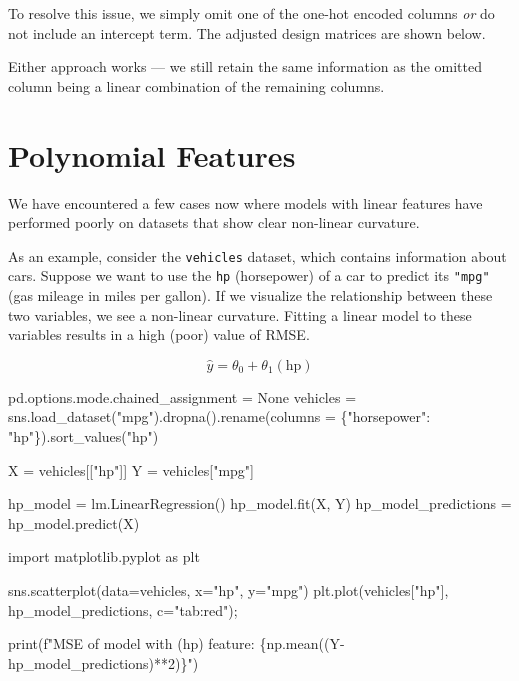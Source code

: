 \documentclass[
  letterpaper,
  DIV=11,
  numbers=noendperiod]{scrreprt}
\newenvironment{Shaded}{\begin{snugshade}}{\end{snugshade}}
\newcommand{\BuiltInTok}[1]{\textcolor[rgb]{0.00,0.23,0.31}{#1}}
\newcommand{\DecValTok}[1]{\textcolor[rgb]{0.68,0.00,0.00}{#1}}
\newcommand{\ImportTok}[1]{\textcolor[rgb]{0.00,0.46,0.62}{#1}}
\newcommand{\NormalTok}[1]{\textcolor[rgb]{0.00,0.23,0.31}{#1}}
\newcommand{\OperatorTok}[1]{\textcolor[rgb]{0.37,0.37,0.37}{#1}}
\newcommand{\SpecialCharTok}[1]{\textcolor[rgb]{0.37,0.37,0.37}{#1}}
\newcommand{\SpecialStringTok}[1]{\textcolor[rgb]{0.13,0.47,0.30}{#1}}
\newcommand{\StringTok}[1]{\textcolor[rgb]{0.13,0.47,0.30}{#1}}
\newcommand{\VariableTok}[1]{\textcolor[rgb]{0.07,0.07,0.07}{#1}}
\begin{document}
To resolve this issue, we simply omit one of the one-hot encoded columns
\emph{or} do not include an intercept term. The adjusted design matrices
are shown below.

Either approach works --- we still retain the same information as the
omitted column being a linear combination of the remaining columns.

\section{Polynomial Features}\label{polynomial-features}

We have encountered a few cases now where models with linear features
have performed poorly on datasets that show clear non-linear curvature.

As an example, consider the \texttt{vehicles} dataset, which contains
information about cars. Suppose we want to use the \texttt{hp}
(horsepower) of a car to predict its \texttt{"mpg"} (gas mileage in
miles per gallon). If we visualize the relationship between these two
variables, we see a non-linear curvature. Fitting a linear model to
these variables results in a high (poor) value of RMSE.

\[\hat{y} = \theta_0 + \theta_1 (\text{hp})\]

\begin{Shaded}
\begin{Highlighting}[]
\NormalTok{pd.options.mode.chained\_assignment }\OperatorTok{=} \VariableTok{None} 
\NormalTok{vehicles }\OperatorTok{=}\NormalTok{ sns.load\_dataset(}\StringTok{"mpg"}\NormalTok{).dropna().rename(columns }\OperatorTok{=}\NormalTok{ \{}\StringTok{"horsepower"}\NormalTok{: }\StringTok{"hp"}\NormalTok{\}).sort\_values(}\StringTok{"hp"}\NormalTok{)}

\NormalTok{X }\OperatorTok{=}\NormalTok{ vehicles[[}\StringTok{"hp"}\NormalTok{]]}
\NormalTok{Y }\OperatorTok{=}\NormalTok{ vehicles[}\StringTok{"mpg"}\NormalTok{]}

\NormalTok{hp\_model }\OperatorTok{=}\NormalTok{ lm.LinearRegression()}
\NormalTok{hp\_model.fit(X, Y)}
\NormalTok{hp\_model\_predictions }\OperatorTok{=}\NormalTok{ hp\_model.predict(X)}

\ImportTok{import}\NormalTok{ matplotlib.pyplot }\ImportTok{as}\NormalTok{ plt}

\NormalTok{sns.scatterplot(data}\OperatorTok{=}\NormalTok{vehicles, x}\OperatorTok{=}\StringTok{"hp"}\NormalTok{, y}\OperatorTok{=}\StringTok{"mpg"}\NormalTok{)}
\NormalTok{plt.plot(vehicles[}\StringTok{"hp"}\NormalTok{], hp\_model\_predictions, c}\OperatorTok{=}\StringTok{"tab:red"}\NormalTok{)}\OperatorTok{;}

\BuiltInTok{print}\NormalTok{(}\SpecialStringTok{f"MSE of model with (hp) feature: }\SpecialCharTok{\{}\NormalTok{np}\SpecialCharTok{.}\NormalTok{mean((Y}\OperatorTok{{-}}\NormalTok{hp\_model\_predictions)}\OperatorTok{**}\DecValTok{2}\NormalTok{)}\SpecialCharTok{\}}\SpecialStringTok{"}\NormalTok{)}
\end{Highlighting}
\end{Shaded}
\end{document}
